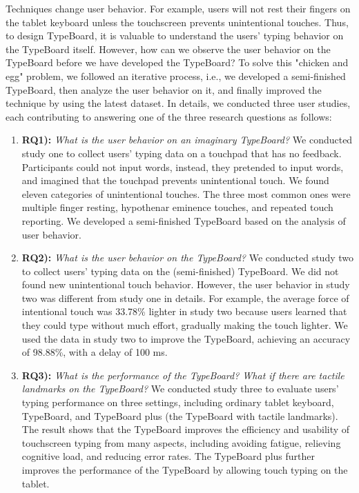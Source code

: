 Techniques change user behavior. For example, users will not rest their fingers on the tablet keyboard unless the touchscreen prevents unintentional touches. Thus, to design TypeBoard, it is valuable to understand the users' typing behavior on the TypeBoard itself. However, how can we observe the user behavior on the TypeBoard before we have developed the TypeBoard? To solve this "chicken and egg" problem, we followed an iterative process, i.e., we developed a semi-finished TypeBoard, then analyze the user behavior on it, and finally improved the technique by using the latest dataset. In details, we conducted three user studies, each contributing to answering one of the three research questions as follows:


\begin{enumerate}
	\item{\textbf{RQ1):} \emph{What is the user behavior on an imaginary TypeBoard?} We conducted study one to collect users' typing data on a touchpad that has no feedback. Participants could not input words, instead, they pretended to input words, and imagined that the touchpad prevents unintentional touch. We found eleven categories of unintentional touches. The three most common ones were multiple finger resting, hypothenar eminence touches, and repeated touch reporting. We developed a semi-finished TypeBoard based on the analysis of user behavior.}
	\item{\textbf{RQ2):} \emph{What is the user behavior on the TypeBoard?} We conducted study two to collect users' typing data on the (semi-finished) TypeBoard. We did not found new unintentional touch behavior. However, the user behavior in study two was different from study one in details. For example, the average force of intentional touch was 33.78\% lighter in study two because users learned that they could type without much effort, gradually making the touch lighter. We used the data in study two to improve the TypeBoard, achieving an accuracy of 98.88\%, with a delay of 100 ms.}
	\item{\textbf{RQ3):} \emph{What is the performance of the TypeBoard? What if there are tactile landmarks on the TypeBoard?} We conducted study three to evaluate users' typing performance on three settings, including ordinary tablet keyboard, TypeBoard, and TypeBoard plus (the TypeBoard with tactile landmarks). The result shows that the TypeBoard improves the efficiency and usability of touchscreen typing from many aspects, including avoiding fatigue, relieving cognitive load, and reducing error rates. The TypeBoard plus further improves the performance of the TypeBoard by allowing touch typing on the tablet.}
\end{enumerate}

